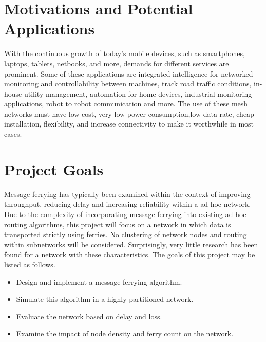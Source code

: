 

\section{Motivations and Potential Applications}


With the continuous growth of today's mobile devices, such as smartphones, laptops, tablets, netbooks, and more, demands for different services are prominent. 
Some of these applications are integrated intelligence for networked monitoring and controllability between machines, track road traffic conditions, in-house utility management, automation for home devices, industrial monitoring applications, robot to robot communication and more.  
The use of these mesh networks must have low-cost, very low power consumption,low data rate, cheap installation, flexibility, and increase connectivity to make it worthwhile in most cases.

\section{Project Goals}

Message ferrying has typically been examined within the context of improving throughput, reducing delay and increasing reliability within a ad hoc network.
Due to the complexity of incorporating message ferrying into existing ad hoc routing algorithms, this project will focus on a network in which data is transported strictly using ferries.
No clustering of network nodes and routing within subnetworks will be considered.
Surprisingly, very little research has been found for a network with these characteristics.
The goals of this project may be listed as follows.

\begin{itemize}
\item Design and implement a message ferrying algorithm.
\item Simulate this algorithm in a highly partitioned network.
\item Evaluate the network based on delay and loss.
\item Examine the impact of node density and ferry count on the network.
\end{itemize}

